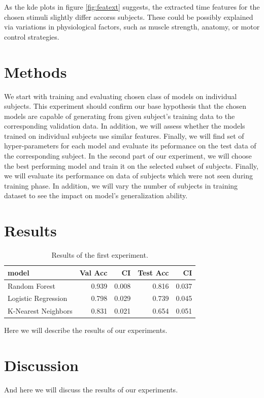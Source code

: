 \documentclass[10pt]{article}
\begin{document}
As the kde plots in figure \ref{fig:featext} suggests, the extracted time features for the chosen stimuli slightly differ accorss subjects.
These could be possibly explained via variations in physiological factors, such as muscle strength, anatomy, or motor control strategies.

\section{Methods}
We start with training and evaluating chosen class of models on individual subjects. This experiment should 
confirm our base hypothesis that the chosen models are capable of generating from given subject's training data to the corresponding validation data.
In addition, we will assess whether the models trained on individual subjects use similar features. Finally, we will find set of hyper-parameters for each
model and evaluate its peformance on the test data of the corresponding subject. In the second part of our experiment, we will choose the best performing model and train it on the selected 
subset of subjects. Finally, we will evaluate its performance on data of subjects which were not seen during training phase. In addition,
we will vary the number of subjects in training dataset to see the impact on model's generalization ability.


\section{Results}
\begin{table}[!ht]
    \centering
    \begin{tabular}{lrrrr}
        \toprule
        \textbf{model} & \textbf{Val Acc} & \textbf{CI} & \textbf{Test Acc} & \textbf{CI} \\
        \midrule
        Random Forest & 0.939 & 0.008 & 0.816 & 0.037 \\
        Logistic Regression & 0.798 & 0.029 & 0.739 & 0.045 \\
        K-Nearest Neighbors & 0.831 & 0.021 & 0.654 & 0.051 \\
        \bottomrule
    \end{tabular}
    \caption{Results of the first experiment.}
    \label{tab:results1}
\end{table}

Here we will describe the results of our experiments. %

\section{Discussion}
And here we will discuss the results of our experiments.

\newpage


\end{document}
